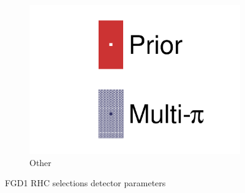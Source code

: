 \begin{figure}[h]
\begin{subfigure}[t]{0.32\textwidth}
		\includegraphics[width=\textwidth,page=54, trim={0mm 0mm 0mm 0mm}, clip]{figures/mach3/2018/data/2018a_FixedCov_RedCov_Mpi_Data_merge_drawPar_withDet}
		\caption{Other}
	\end{subfigure}
	\caption{FGD1 \numu RHC selections detector parameters}
	\label{fig:data_multipi_det_fdg1_numuRHC}
\end{figure}

